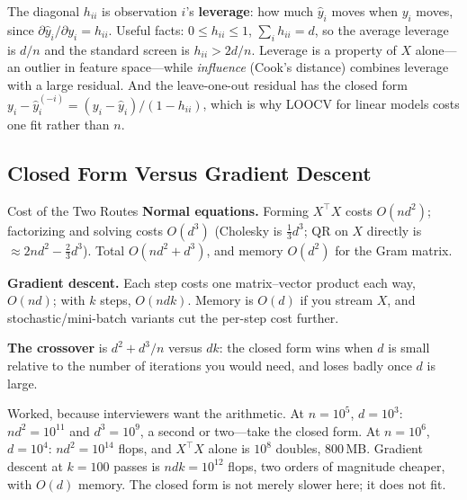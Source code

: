 The diagonal $h_{ii}$ is observation $i$'s \textbf{leverage}: how much $\hat y_i$ moves when $y_i$ moves, since $\partial \hat y_i / \partial y_i = h_{ii}$. Useful facts: $0 \le h_{ii} \le 1$, $\sum_i h_{ii} = d$, so the average leverage is $d/n$ and the standard screen is $h_{ii} > 2d/n$. Leverage is a property of $X$ alone---an outlier in feature space---while \emph{influence} (Cook's distance) combines leverage with a large residual. And the leave-one-out residual has the closed form $y_i - \hat y_i^{(-i)} = (y_i - \hat y_i)/(1 - h_{ii})$, which is why LOOCV for linear models costs one fit rather than $n$.

\subsection{Closed Form Versus Gradient Descent}

\begin{mathresult}{Cost of the Two Routes}
\textbf{Normal equations.} Forming $X^{\top}X$ costs $O(nd^2)$; factorizing and solving costs $O(d^3)$ (Cholesky is $\tfrac{1}{3}d^3$; QR on $X$ directly is $\approx 2nd^2 - \tfrac{2}{3}d^3$). Total $O(nd^2 + d^3)$, and memory $O(d^2)$ for the Gram matrix.

\textbf{Gradient descent.} Each step costs one matrix--vector product each way, $O(nd)$; with $k$ steps, $O(ndk)$. Memory is $O(d)$ if you stream $X$, and stochastic/mini-batch variants cut the per-step cost further.

\textbf{The crossover} is $d^2 + d^3/n$ versus $dk$: the closed form wins when $d$ is small relative to the number of iterations you would need, and loses badly once $d$ is large.
\end{mathresult}

Worked, because interviewers want the arithmetic. At $n = 10^5$, $d = 10^3$: $nd^2 = 10^{11}$ and $d^3 = 10^9$, a second or two---take the closed form. At $n = 10^6$, $d = 10^4$: $nd^2 = 10^{14}$ flops, and $X^{\top}X$ alone is $10^8$ doubles, $800$\,MB. Gradient descent at $k=100$ passes is $ndk = 10^{12}$ flops, two orders of magnitude cheaper, with $O(d)$ memory. The closed form is not merely slower here; it does not fit.

